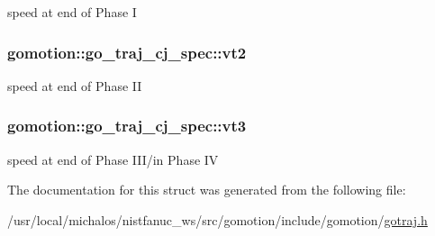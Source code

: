 speed at end of Phase I 

\hypertarget{structgomotion_1_1go__traj__cj__spec_a51ff6be4a6f00e4b787b50cd96c6fbb2}{
\subsubsection[{vt2}]{ gomotion\-::go\-\_\-traj\-\_\-cj\-\_\-spec\-::vt2}}\label{structgomotion_1_1go__traj__cj__spec_a51ff6be4a6f00e4b787b50cd96c6fbb2}


speed at end of Phase I\-I 

\hypertarget{structgomotion_1_1go__traj__cj__spec_ac50e142a4852e8176bc1e03d57658917}{
\subsubsection[{vt3}]{ gomotion\-::go\-\_\-traj\-\_\-cj\-\_\-spec\-::vt3}}\label{structgomotion_1_1go__traj__cj__spec_ac50e142a4852e8176bc1e03d57658917}


speed at end of Phase I\-I\-I/in Phase I\-V 



The documentation for this struct was generated from the following file\-:\begin{DoxyCompactItemize}
\item 
/usr/local/michalos/nistfanuc\-\_\-ws/src/gomotion/include/gomotion/\hyperlink{gotraj_8h}{gotraj.\-h}\end{DoxyCompactItemize}
